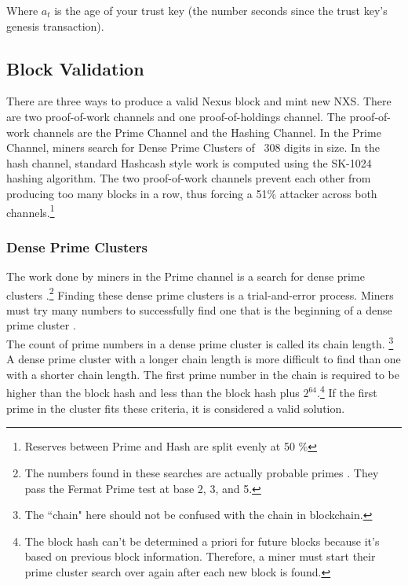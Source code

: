 \documentclass[11pt]{article}
\begin{document}
\noindent Where $a_t$ is the age of your trust key (the number seconds since the trust key's genesis transaction).

\subsection{Block Validation}

There are three ways to produce a valid Nexus block and mint new NXS.
There are two proof-of-work channels and one proof-of-holdings channel.
The proof-of-work channels are the Prime Channel and the Hashing Channel.
In the Prime Channel, miners search for Dense Prime Clusters of ~308 digits in size.
In the hash channel, standard Hashcash \cite{hashcash} style work is computed using the SK-1024 hashing algorithm. 
The two proof-of-work channels prevent each other from producing too many blocks in a row, thus forcing a 51\% attacker across both channels.\footnote{Reserves between Prime and Hash are split evenly at 50 \%}

\subsubsection{Dense Prime Clusters}

The work done by miners in the Prime channel is a search for dense prime clusters \cite{wikiprimecluster}.\footnote{The numbers found in these searches are actually probable primes \cite{wikiprobable}. They pass the Fermat Prime test \cite{wikifermat} at base 2, 3, and 5.}
Finding these dense prime clusters is a trial-and-error process.
Miners must try many numbers to successfully find one that is the beginning of a dense prime cluster \cite{wolframprimecluster,primesolominer}.\\ 

\noindent The count of prime numbers in a dense prime cluster is called its chain length.
\footnote{The ``chain" here should not be confused with the chain in blockchain.}
A dense prime cluster with a longer chain length is more difficult to find than one with a shorter chain length.
The first prime number in the chain is required to be higher than the block hash and less than the block hash plus $2^{64}$.\footnote{The block hash can't be determined a priori for future blocks because it's based on previous block information. 
Therefore, a miner must start their prime cluster search over again after each new block is found.}
If the first prime in the cluster fits these criteria, it is considered a valid solution.\\
\end{document}
